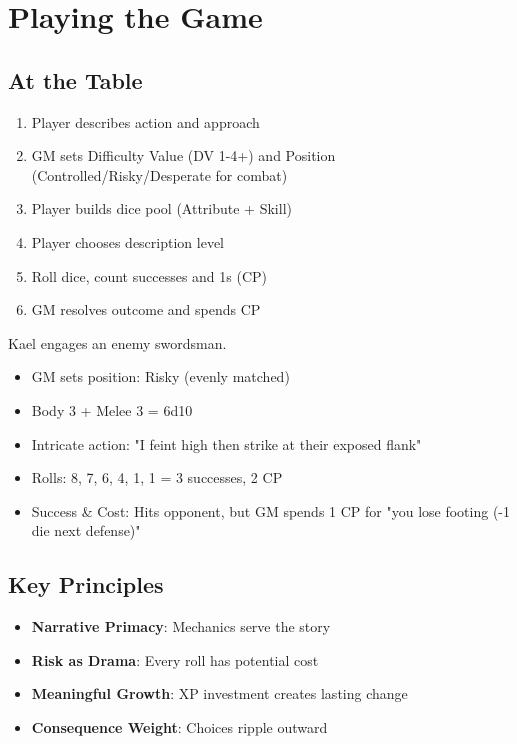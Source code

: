 \documentclass[11pt]{article}
\begin{document}
\section{Playing the Game}

\subsection{At the Table}
\begin{enumerate}
    \item Player describes action and approach
    \item GM sets Difficulty Value (DV 1-4+) and Position (Controlled/Risky/Desperate for combat)
    \item Player builds dice pool (Attribute + Skill)
    \item Player chooses description level
    \item Roll dice, count successes and 1s (CP)
    \item GM resolves outcome and spends CP
\end{enumerate}

\begin{examplebox}
Kael engages an enemy swordsman.
\begin{itemize}
    \item GM sets position: Risky (evenly matched)
    \item Body 3 + Melee 3 = 6d10
    \item Intricate action: "I feint high then strike at their exposed flank"
    \item Rolls: 8, 7, 6, 4, 1, 1 = 3 successes, 2 CP
    \item Success \& Cost: Hits opponent, but GM spends 1 CP for "you lose footing (-1 die next defense)"
\end{itemize}
\end{examplebox}

\subsection{Key Principles}
\begin{itemize}
    \item \textbf{Narrative Primacy}: Mechanics serve the story
    \item \textbf{Risk as Drama}: Every roll has potential cost
    \item \textbf{Meaningful Growth}: XP investment creates lasting change
    \item \textbf{Consequence Weight}: Choices ripple outward
\end{itemize}
\end{document}
